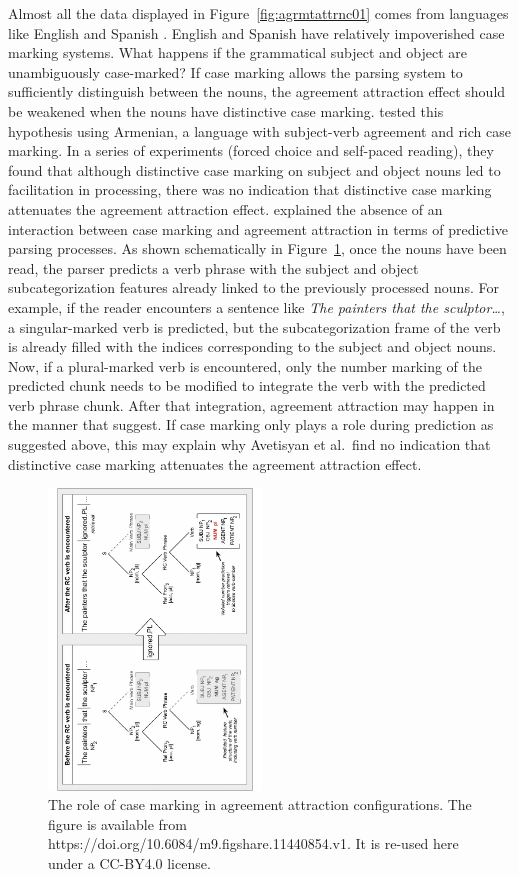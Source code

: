 \documentclass{cambridge7A}\usepackage[]{graphicx}\usepackage[]{color}
\begin{document}
Almost all the data displayed in Figure~\ref{fig:agrmtattrnc01} comes from languages like English and Spanish \citep[an exception is][who investigated Arabic]{TuckerIdrissiAlmeida2015}. English and Spanish have relatively impoverished case marking systems. What happens if the grammatical subject and object are unambiguously case-marked? If case marking allows the parsing system to sufficiently distinguish between the nouns, the agreement attraction effect should be weakened when the nouns have distinctive  case marking. \cite{ALV2020} tested this hypothesis using  Armenian, a language with subject-verb agreement and rich case marking. In a series of experiments (forced choice and self-paced reading), they found that although distinctive case marking on subject and object nouns led to facilitation in processing, there was no indication that distinctive case marking  attenuates the  agreement attraction effect. \cite{ALV2020} explained the absence of an interaction between case marking and agreement attraction in terms of predictive parsing processes. As shown schematically in Figure~\ref{fig:serinecase}, once the nouns have been read, the parser predicts a verb phrase with the subject and object  subcategorization features already linked to the previously processed nouns. For example, if the reader encounters a sentence like \textit{The painters that the sculptor\dots}, a singular-marked verb is predicted, but the subcategorization frame of the  verb is already filled with the  indices corresponding to the subject and object nouns. Now, if a plural-marked verb is encountered, only the number marking of the predicted chunk needs to be modified to integrate the verb with the predicted verb phrase chunk. After that integration, agreement attraction may happen in the manner that \cite{WagersLauPhillips2009} suggest. If case marking only plays a role during prediction as suggested above, 
this may explain why Avetisyan et al.\ find no indication that distinctive case marking attenuates the agreement attraction effect.  

\begin{figure}[!htbp]
\centering
\includegraphics[height=8cm,angle=-90]{figures/serine}
\caption{The role of case marking in agreement attraction configurations. The figure is available from https://doi.org/10.6084/m9.figshare.11440854.v1. It is re-used here under a CC-BY4.0 license.}\label{fig:serinecase}
\end{figure} 
\end{document}
